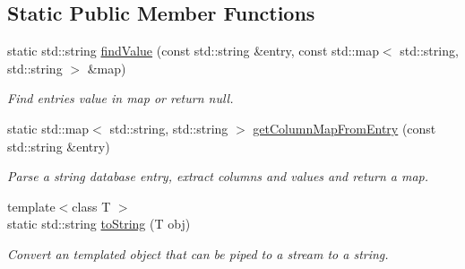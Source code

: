 \subsection*{\-Static \-Public \-Member \-Functions}
\begin{DoxyCompactItemize}
\item 
static std\-::string \hyperlink{classcryomesh_1_1manager_1_1DatabaseObject_aa4ef26ce91fea092f146e67add491e0f}{find\-Value} (const std\-::string \&entry, const std\-::map$<$ std\-::string, std\-::string $>$ \&map)
\begin{DoxyCompactList}\small\item\em \-Find entries value in map or return null. \end{DoxyCompactList}\item 
static std\-::map$<$ std\-::string, \*
std\-::string $>$ \hyperlink{classcryomesh_1_1manager_1_1DatabaseObject_a04ce7c34b51e3290c972121cf2f16565}{get\-Column\-Map\-From\-Entry} (const std\-::string \&entry)
\begin{DoxyCompactList}\small\item\em \-Parse a string database entry, extract columns and values and return a map. \end{DoxyCompactList}\item 
{\footnotesize template$<$class T $>$ }\\static std\-::string \hyperlink{classcryomesh_1_1manager_1_1DatabaseObject_a1b37d9d07009ae1c71f644761d36b468}{to\-String} (\-T obj)
\begin{DoxyCompactList}\small\item\em \-Convert an templated object that can be piped to a stream to a string. \end{DoxyCompactList}\end{DoxyCompactItemize}
